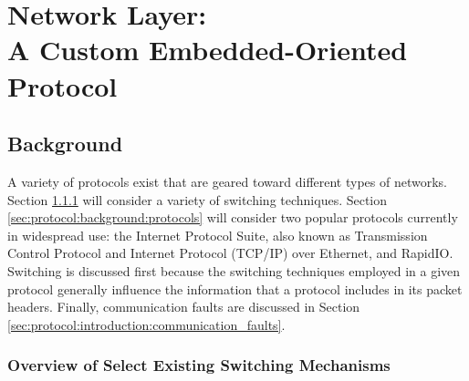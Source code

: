 \chapter{Network Layer:\\ A Custom Embedded-Oriented Protocol}\label{sec:protocol}

\section{Background}\label{sec:protocol:background}

A variety of protocols exist that are geared toward different types of networks. Section \ref{sec:protocol:background:switching} will consider a variety of switching techniques. Section \ref{sec:protocol:background:protocols} will consider two popular protocols currently in widespread use: the Internet Protocol Suite, also known as Transmission Control Protocol and Internet Protocol (TCP/IP) over Ethernet, and RapidIO. Switching is discussed first because the switching techniques employed in a given protocol generally influence the information that a protocol includes in its packet headers. Finally, communication faults are discussed in Section \ref{sec:protocol:introduction:communication_faults}.

\subsection{Overview of Select Existing Switching Mechanisms}\label{sec:protocol:background:switching}

